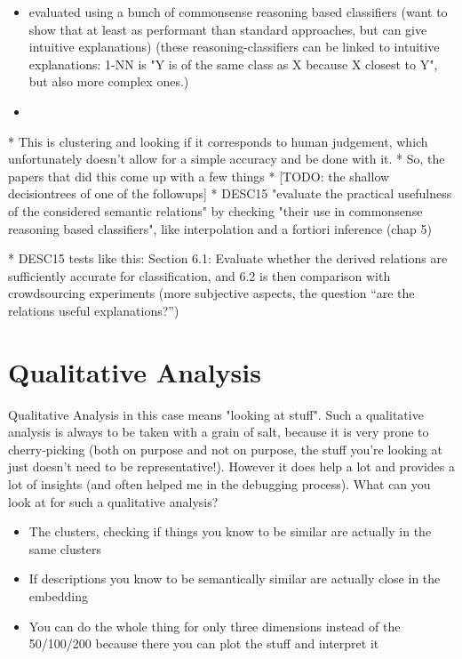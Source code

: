 \begin{itemize}
	\item \cite{Derrac2015} evaluated using a bunch of commonsense reasoning based classifiers (want to show that at least as performant than standard approaches, but can give intuitive explanations) (these reasoning-classifiers can be linked to intuitive explanations: 1-NN is "Y is of the same class as X because X closest to Y", but also more complex ones.) 
	\item 
\end{itemize}

* This is clustering and looking if it corresponds to human judgement, which unfortunately doesn't allow for a simple accuracy and be done with it.
* So, the papers that did this come up with a few things
* [TODO: the shallow decisiontrees of one of the followups]
* DESC15 "evaluate the practical usefulness of the considered semantic relations" by checking "their use in commonsense reasoning based classifiers", like interpolation and a fortiori inference (chap 5)


* DESC15 tests like this: Section 6.1: Evaluate whether the derived relations are sufficiently accurate for classification, and 6.2 is then comparison with crowdsourcing experiments (more subjective aspects, the question “are the relations useful explanations?”)



\section{Qualitative Analysis}

Qualitative Analysis in this case means "looking at stuff". Such a qualitative analysis is always to be taken with a grain of salt, because it is very prone to cherry-picking (both on purpose and not on purpose, the stuff you're looking at just doesn't need to be representative!). However it does help a lot and provides a lot of insights (and often helped me in the debugging process).
What can you look at for such a qualitative analysis?
\begin{itemize}
	\item The clusters, checking if things you know to be similar are actually in the same clusters
	\item If descriptions you know to be semantically similar are actually close in the embedding
	\item You can do the whole thing for only three dimensions instead of the 50/100/200 because there you can plot the stuff and interpret it
\end{itemize}

